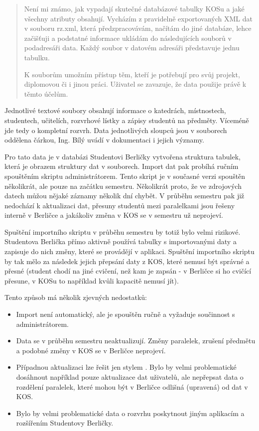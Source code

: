 \documentclass[11pt,twoside,a4paper]{book}
\begin{document}
\begin{quotation}
Není mi známo, jak vypadají skutečné databázové tabulky KOSu a jaké všechny atributy obsahují. Vycházím z pravidelně exportovaných XML dat v souboru rz.xml, která předzpracovávám, načítám do jiné databáze, lehce začišťuji a podstatné informace ukládám do následujících souborů v podadresáři data. Každý soubor v datovém adresáři představuje jednu tabulku.

K souborům umožním přístup těm, kteří je potřebují pro svůj projekt, diplomovou či i jinou práci. Uživatel se zavazuje, že data použije právě k těmto účelům.
\end{quotation}

Jednotlivé textové soubory obsahují informace o katedrách, místnostech, studentech, učitelích, rozvrhové lístky a zápisy studentů na předměty. Víceméně jde tedy o kompletní rozvrh. Data jednotlivých sloupců jsou v souborech oddělena čárkou, Ing. Bílý uvádí v dokumentaci i jejich významy.

Pro tato data je v databázi Studentovi Berličky vytvořena struktura tabulek, která je obrazem struktury dat v souborech. Import dat pak probíhá ručním spouštěním skriptu administrátorem. Tento skript je v současné verzi spouštěn několikrát, ale pouze na začátku semestru. Několikrát proto, že ve zdrojových datech můžou nějaké záznamy několik dní chybět. V průběhu semestru pak již nedochází k aktualizaci dat, přesuny studentů mezi paralelkami jsou řešeny interně v Berličce a jakákoliv změna v KOS se v semestru už neprojeví.

Spuštění importního skriptu v průběhu semestru by totiž bylo velmi rizikové. Studentova Berlička přímo aktivně používá tabulky s importovanými daty a zapisuje do nich změny, které se provádějí v aplikaci. Spuštění importního skriptu by tak mělo za následek jejich přepsání daty z KOS, které nemusí být správné a přesné (student chodí na jiné cvičení, než kam je zapsán - v Berličce si ho cvičící přesune, v KOSu to například kvůli kapacitě nemusí jít).

Tento způsob má několik zjevných nedostatků:
\begin{itemize}
\item Import není automatický, ale je spouštěn ručně a vyžaduje součinnost s administrátorem.
\item Data se v průběhu semestru neaktualizují. Změny paralelek, zrušení předmětu a podobné změny v KOS se v Berličce neprojeví.
\item Případnou aktualizaci lze řešit jen stylem . Bylo by velmi problematické dosáhnout například pouze aktualizace dat uživatelů, ale nepřepsat data o rozdělení paralelek, které mohou být v Berličce odlišná (upravená) od dat v KOS.
\item Bylo by velmi problematické data o rozvrhu poskytnout jiným aplikacím a rozšířením Studentovy Berličky.
\end{itemize}
\end{document}
